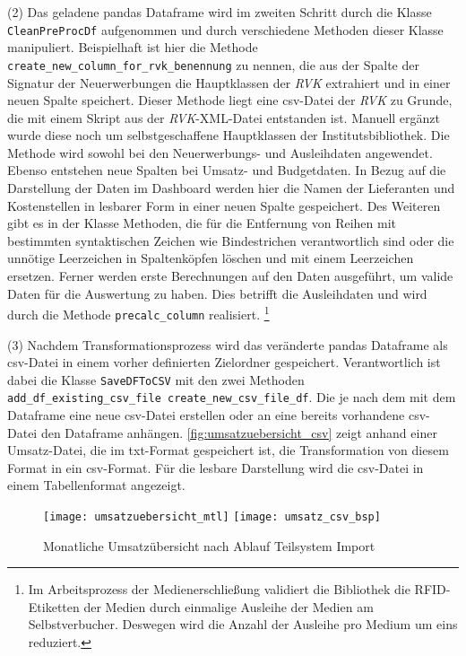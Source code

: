     (2) Das geladene pandas Dataframe wird im zweiten Schritt durch die Klasse \texttt{CleanPreProcDf} aufgenommen und durch verschiedene Methoden dieser Klasse
    manipuliert. Beispielhaft ist hier die Methode \texttt{create\_new\_column\_for\_rvk\_benennung} zu nennen, die aus der Spalte der Signatur 
    der Neuerwerbungen die Hauptklassen der \textit{\acrlong{RVK}} extrahiert und in einer neuen Spalte speichert. Dieser Methode liegt eine csv-Datei
    der \textit{\acrshort{RVK}} zu Grunde, die mit einem Skript aus der \textit{\acrshort{RVK}}-XML-Datei entstanden ist. Manuell ergänzt wurde diese 
    noch um selbstgeschaffene Hauptklassen der Institutsbibliothek. Die Methode wird sowohl bei den Neuerwerbungs- und Ausleihdaten angewendet.
    Ebenso entstehen neue Spalten bei Umsatz- und Budgetdaten. In Bezug auf die Darstellung der Daten im Dashboard werden
    hier die Namen der Lieferanten und Kostenstellen in lesbarer Form in einer neuen Spalte gespeichert. 
    Des Weiteren gibt es in der Klasse Methoden, die für die Entfernung von Reihen mit bestimmten syntaktischen Zeichen wie Bindestrichen verantwortlich sind oder 
    die unnötige Leerzeichen in Spaltenköpfen löschen und mit einem Leerzeichen ersetzen.
    Ferner werden erste Berechnungen auf den Daten ausgeführt, um valide Daten für die Auswertung zu haben. Dies betrifft die Ausleihdaten und wird durch die
    Methode \texttt{precalc\_column} realisiert.
    \footnote{Im Arbeitsprozess der Medienerschließung validiert die Bibliothek die RFID-Etiketten der Medien durch einmalige Ausleihe der Medien am Selbstverbucher.
    Deswegen wird die Anzahl der Ausleihe pro Medium um eins reduziert.}
     
    (3) Nachdem Transformationsprozess wird das veränderte pandas Dataframe als csv-Datei in einem vorher definierten Zielordner gespeichert. 
    Verantwortlich ist dabei die Klasse \texttt{SaveDFToCSV} mit den zwei Methoden \texttt{add\_df\_existing\_csv\_file create\_new\_csv\_file\_df}. 
    Die je nach dem mit dem Dataframe eine neue csv-Datei erstellen oder an eine bereits vorhandene csv-Datei den Dataframe anhängen.
    \autoref{fig:umsatzuebersicht_csv} zeigt anhand einer Umsatz-Datei, die im txt-Format gespeichert ist, die Transformation von diesem Format 
    in ein csv-Format. Für die lesbare Darstellung wird die csv-Datei in einem Tabellenformat angezeigt.

    \begin{figure}[h]
        \centering
            \texttt{[image: umsatzuebersicht\_mtl]}
            \texttt{[image: umsatz\_csv\_bsp]}
            \caption{Monatliche Umsatzübersicht nach Ablauf Teilsystem Import}
            \label{fig:umsatzuebersicht_csv}
    \end{figure}
    
